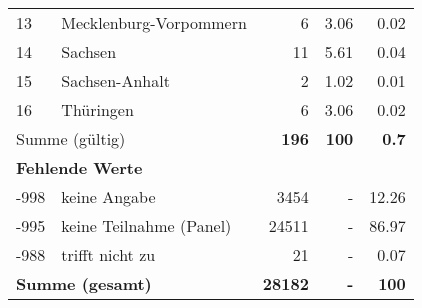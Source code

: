 \begin{longtable}{lXrrr}
     13 &
     \multicolumn{1}{X}{ Mecklenburg-Vorpommern   } &


       \num{6} &
       \num[round-mode=places,round-precision=2]{3,06} &
         \num[round-mode=places,round-precision=2]{0,02} \\

     14 &
     \multicolumn{1}{X}{ Sachsen   } &


       \num{11} &
       \num[round-mode=places,round-precision=2]{5,61} &
         \num[round-mode=places,round-precision=2]{0,04} \\

     15 &
     \multicolumn{1}{X}{ Sachsen-Anhalt   } &


       \num{2} &
       \num[round-mode=places,round-precision=2]{1,02} &
         \num[round-mode=places,round-precision=2]{0,01} \\

     16 &
     \multicolumn{1}{X}{ Thüringen   } &


       \num{6} &
       \num[round-mode=places,round-precision=2]{3,06} &
         \num[round-mode=places,round-precision=2]{0,02} \\
     \midrule
     \multicolumn{2}{l}{Summe (gültig)} &
       \textbf{\num{196}} &
     \textbf{100} &
       \textbf{\num[round-mode=places,round-precision=2]{0,7}} \\
     \multicolumn{5}{l}{\textbf{Fehlende Werte}}\\
       -998 &
       keine Angabe &
         \num{3454} &
        - &
         \num[round-mode=places,round-precision=2]{12,26} \\
       -995 &
       keine Teilnahme (Panel) &
         \num{24511} &
        - &
         \num[round-mode=places,round-precision=2]{86,97} \\
       -988 &
       trifft nicht zu &
         \num{21} &
        - &
         \num[round-mode=places,round-precision=2]{0,07} \\
     \midrule
     \multicolumn{2}{l}{\textbf{Summe (gesamt)}} &
          \textbf{\num{28182}} &
        \textbf{-} &
        \textbf{100} \\
     \bottomrule
     \end{longtable}
     
